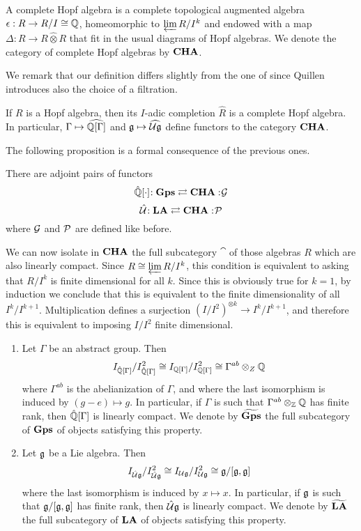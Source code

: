 \begin{defn}
A complete Hopf algebra is a complete topological augmented algebra $\epsilon: R\to R/I\cong\mathbb{Q}$, homeomorphic to $\varprojlim R/I^k$ and endowed with a map $\Delta: R\to R\hat{\otimes}R$ that fit in the usual diagrams of Hopf algebras.
We denote the category of complete Hopf algebras by $\operatorname{\bf{CHA}}$.
\end{defn}

We remark that our definition differs slightly from the one of \cite{quillen-r} since Quillen introduces also the choice of a filtration.

\begin{exam}
If $R$ is a Hopf algebra, then its $I$-adic completion $\hat{R}$ is a complete Hopf algebra. In particular, $\Gamma\mapsto \widehat{\mathbb{Q}[\Gamma]}$ and $\mathfrak{g}\mapsto\widehat{\mathcal{U}\mathfrak{g}}$ define functors to the category $\operatorname{\bf{CHA}}$.
\end{exam}

The following proposition is a formal consequence of the previous ones.

\begin{prop}
There are adjoint pairs of functors
\[
\hat{\mathbb{Q}}[\cdot]\negmedspace: \operatorname{\bf{Gps}}\rightleftarrows \operatorname{\bf{CHA}}:\negmedspace \mathcal{G}
\]
\[
\hat{\mathcal{U}}\negmedspace: \operatorname{\bf{LA}}\rightleftarrows \operatorname{\bf{CHA}}:\negmedspace \mathcal{P}
\]
where $\mathcal{G}$ and $\mathcal{P}$ are defined like before.
\end{prop}

We can now isolate in $\operatorname{\bf{CHA}}$ the full subcategory $\cat$ of those algebras $R$ which are also linearly compact. Since $R\cong\varprojlim R/I^k$, this condition is equivalent to asking that $R/I^k$ is finite dimensional for all $k$. Since this is obviously true for $k=1$, by induction we conclude that this is equivalent to the finite dimensionality of all $I^k/I^{k+1}$. Multiplication defines a surjection $(I/I^2)^{\otimes k}\to I^k/I^{k+1}$, and therefore this is equivalent to imposing $I/I^2$ finite dimensional.

\begin{exam}
\begin{enumerate}
	\item Let $\Gamma$ be an abstract group. Then
	\[
	I_{\hat{\mathbb{Q}}[\Gamma]}/I_{\hat{\mathbb{Q}}[\Gamma]}^2\cong I_{{\mathbb{Q}}[\Gamma]}/I_{{\mathbb{Q}}[\Gamma]}^2\cong \Gamma^{ab}\otimes_Z\mathbb{Q}
	\]
	where $\Gamma^{ab}$ is the abelianization of $\Gamma$, and where the last isomorphism is induced by $(g-e)\mapsto g$. In particular, if $\Gamma$ is such that $\Gamma^{ab}\otimes_{\mathbb{Z}} \mathbb{Q}$ has finite rank, then $\hat{\mathbb{Q}}[\Gamma]$ is linearly compact. We denote by $\widetilde{\operatorname{\bf{Gps}}}$ the full subcategory of $\operatorname{\bf{Gps}}$ of objects satisfying this property.
	\item 
	Let $\mathfrak{g}$ be a Lie algebra. Then
	\[
	I_{\hat{\mathcal{U}}\mathfrak{g}}/I_{\hat{\mathcal{U}}\mathfrak{g}}^2\cong I_{{\mathcal{U}}\mathfrak{g}}/I_{{\mathcal{U}}\mathfrak{g}}^2\cong \mathfrak{g}/[\mathfrak{g},\mathfrak{g}]
	\]
	where the last isomorphism is induced by $x\mapsto x$. In particular, if $\mathfrak{g}$ is such that $\mathfrak{g}/[\mathfrak{g},\mathfrak{g}]$ has finite rank, then $\hat{\mathcal{U}}\mathfrak{g}$ is linearly compact. We denote by $\widetilde{\operatorname{\bf{LA}}}$ the full subcategory of $\operatorname{\bf{LA}}$ of objects satisfying this property.
\end{enumerate}
\end{exam}

